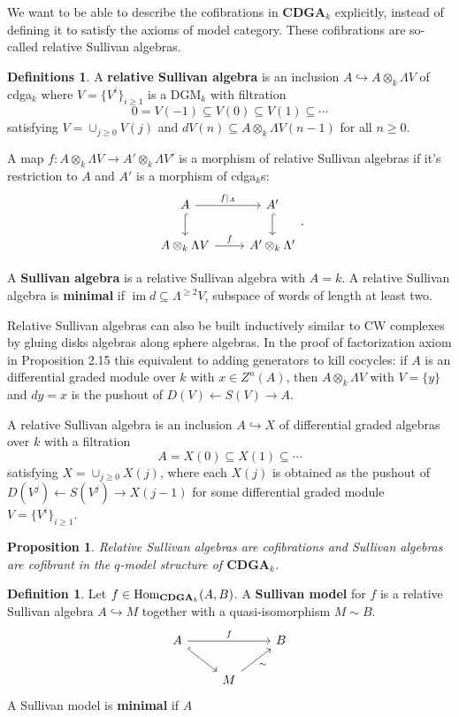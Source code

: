 \documentclass[psamsfonts]{amsart}
\newtheorem{prop}[thm]{Proposition}
\theoremstyle{definition}
\newtheorem{defn}[thm]{Definition}
\newtheorem{defns}[thm]{Definitions}
\theoremstyle{remark}
\newcommand{\Hom}{\textup{Hom}}
\newcommand{\CDGA}{\mathbf{CDGA}}
\DeclareMathOperator{\im}{im}
\numberwithin{equation}{section}
\begin{document}
We want to be able to describe the cofibrations in $\CDGA_k$ explicitly, instead of defining it
to satisfy the axioms of model category. These cofibrations are so-called relative Sullivan algebras.

\begin{defns}
A \textbf{relative Sullivan algebra} is an inclusion $A\hookrightarrow A\otimes_k\Lambda V$ of cdga$_k$ where $V=\{V^i\}_{i\geq1}$ is a DGM$_k$ with filtration
\[0=V(-1)\subseteq V(0)\subseteq V(1)\subseteq\cdots\]
satisfying $V=\cup_{j\geq0}V(j)$ and $dV(n)\subseteq A\otimes_k\Lambda V(n-1)$ for all $n\geq0$.

A map $f:A\otimes_k\Lambda V\to A'\otimes_k\Lambda V'$ is a morphism of relative Sullivan algebras if it's restriction to $A$ and $A'$ is a morphism of cdga$_k$s:
\[\begin{tikzcd}
A\arrow[d,hookrightarrow]\arrow[r,"f|_A"]&A'\arrow[d,hookrightarrow]\\
A\otimes_k\Lambda V\arrow[r,"f"]&A'\otimes_k\Lambda'
\end{tikzcd}.\]

A \textbf{Sullivan algebra} is a relative Sullivan algebra with $A=k$. A relative Sullivan algebra is \textbf{minimal} if $\im d\subseteq\Lambda^{\geq2}V$, subspace of words of length at least two.
\end{defns}

Relative Sullivan algebras can also be built inductively similar to CW complexes by gluing disks algebras along sphere algebras. In the proof of factorization axiom in Proposition 2.15 this equivalent to adding generators to kill cocycles: if $A$ is an differential graded module over $k$ with $x\in Z^n(A)$, then $A\otimes_k\Lambda V$ with $V=\{y\}$ and $dy=x$ is the pushout of $D(V)\leftarrow S(V)\rightarrow A$.

A relative Sullivan algebra is an inclusion $A\hookrightarrow X$ of differential graded algebras over $k$ with a filtration
\[A=X(0)\subseteq X(1)\subseteq\cdots\]
satisfying $X=\cup_{j\geq0}X(j)$, where each $X(j)$ is obtained as the pushout of $D(V^j)\leftarrow S(V^j)\rightarrow X(j-1)$ for some differential graded module $V=\{V^i\}_{i\geq1}$.

\begin{prop}
Relative Sullivan algebras are cofibrations and Sullivan algebras are cofibrant in the $q$-model structure of $\CDGA_k$.
\end{prop}

\begin{defn}
Let $f\in\Hom_{\CDGA_k}(A,B)$. A \textbf{Sullivan model} for $f$ is a relative Sullivan algebra $A\hookrightarrow M$ together with a quasi-isomorphism $M\sim B$.
\[\begin{tikzcd}
A\arrow[dr,hookrightarrow]\arrow[rr,"f"]&&B\\
&M\arrow[ur,"\sim"']
\end{tikzcd}\]
A Sullivan model is \textbf{minimal} if $A$
\end{defn}
\end{document}
